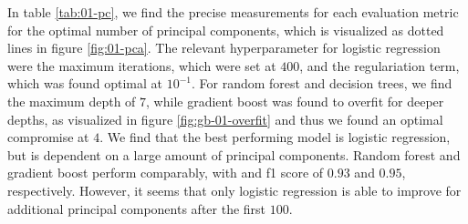 In table \ref{tab:01-pc}, we find the precise measurements for each evaluation metric for the optimal number of principal components, which is visualized as dotted lines in figure \ref{fig:01-pca}. The relevant hyperparameter for logistic regression were the maximum iterations, which were set at $400$, and the regulariation term, which was found optimal at $10^{-1}$. For random forest and decision trees, we find the maximum depth of $7$, while gradient boost was found to overfit for deeper depths, as visualized in figure \ref{fig:gb-01-overfit} and thus we found an optimal compromise at $4$. We find that the best performing model is logistic regression, but is dependent on a large amount of principal components. Random forest and gradient boost perform comparably, with and f1 score of $0.93$ and $0.95$, respectively. However, it seems that only logistic regression is able to improve for additional principal components after the first $100$.

\clearpage

